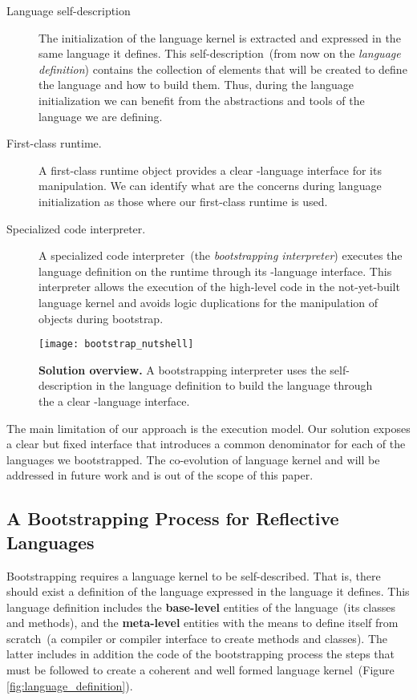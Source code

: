 \begin{description}
\item[Language self-description] The initialization of the language kernel is extracted and expressed in the same language it defines. This self-description~(from now on the \emph{language definition}) contains the collection of elements that will be created to define the language and how to build them. Thus, during the language initialization we can benefit from the abstractions and tools of the language we are defining.
\item[First-class runtime.] A first-class runtime object provides a clear \VM-language interface for its manipulation. We can identify what are the \VM concerns during language initialization as those where our first-class runtime is used.
\item[Specialized code interpreter.] A specialized code interpreter~(the \emph{bootstrapping interpreter}) executes the language definition on the runtime through its \VM-language interface. This interpreter allows the execution of the high-level code in the not-yet-built language kernel and avoids logic duplications for the manipulation of objects during bootstrap.
\end{description}

\begin{figure}[ht]
\center
\texttt{[image: bootstrap\_nutshell]}
\caption{\textbf{Solution overview.} A bootstrapping interpreter uses the self-description in the language definition to build the language through the a clear \VM-language interface.\label{fig:bootstrapping_overview}}
\end{figure}

The main limitation of our approach is the \VM execution model. Our solution exposes a clear but fixed \VM interface that introduces a common denominator for each of the languages we bootstrapped. The co-evolution of language kernel and \VM will be addressed in future work and is out of the scope of this paper.

\subsection{A Bootstrapping Process for Reflective Languages}

Bootstrapping requires a language kernel to be self-described. That is, there should exist a definition of the language expressed in the language it defines. This language definition includes the \textbf{base-level} entities of the language~(its classes and methods), and the \textbf{meta-level} entities with the means to define itself from scratch~(\eg a compiler or compiler interface to create methods and classes). The latter includes in addition the code of the bootstrapping process \ie the steps that must be followed to create a coherent and well formed language kernel~(Figure \ref{fig:language_definition}).

